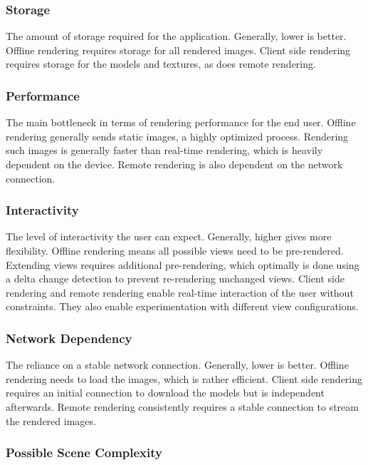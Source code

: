 \subsubsection{Storage}

The amount of storage required for the application. Generally, lower is better. Offline rendering requires storage for all rendered images. Client side rendering requires storage for the models and textures, as does remote rendering.

\subsubsection{Performance}

The main bottleneck in terms of rendering performance for the end user. Offline rendering generally sends static images, a highly optimized process. Rendering such images is generally faster than real-time rendering, which is heavily dependent on the device. Remote rendering is also dependent on the network connection.

\subsubsection{Interactivity}

The level of interactivity the user can expect. Generally, higher gives more flexibility. Offline rendering means all possible views need to be pre-rendered. Extending views requires additional pre-rendering, which optimally is done using a delta change detection to prevent re-rendering unchanged views. Client side rendering and remote rendering enable real-time interaction of the user without constraints. They also enable experimentation with different view configurations.

\subsubsection{Network Dependency}

The reliance on a stable network connection. Generally, lower is better. Offline rendering needs to load the images, which is rather efficient. Client side rendering requires an initial connection to download the models but is independent afterwards. Remote rendering consistently requires a stable connection to stream the rendered images.

\subsubsection{Possible Scene Complexity}

